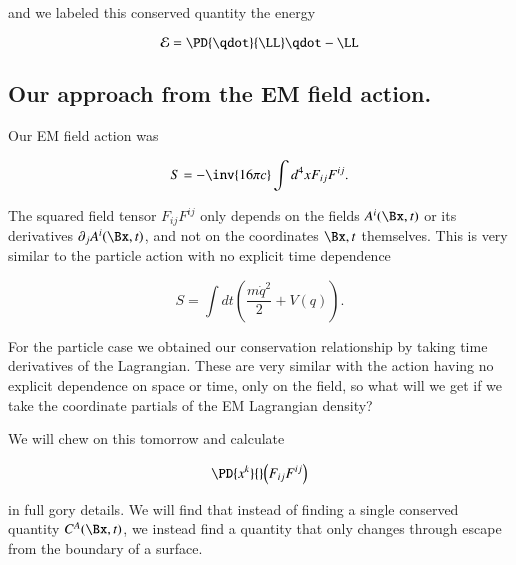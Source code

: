 and we labeled this conserved quantity the energy

\begin{equation}\label{eqn:relativisticElectrodynamicsL21:420}
\mathcal{E} = \PD{\qdot}{\LL} \qdot -\LL 
\end{equation}

\subsection{Our approach from the EM field action.}

Our EM field action was

\begin{equation}\label{eqn:relativisticElectrodynamicsL21:500}
S = -\inv{16 \pi c} \int d^4 x F_{i j} F^{i j}.
\end{equation}

The squared field tensor $F_{i j} F^{i j}$ only depends on the fields $A^i(\Bx, t)$ or its derivatives $\partial_j A^i(\Bx, t)$, and not on the coordinates $\Bx, t$ themselves.  This is very similar to the particle action with no explicit time dependence

\begin{equation}\label{eqn:relativisticElectrodynamicsL21:520}
S = \int dt \left( \frac{m \dot{q}^2}{2} + V(q) \right).
\end{equation}

For the particle case we obtained our conservation relationship by taking time derivatives of the Lagrangian.  These are very similar with the action having no explicit dependence on space or time, only on the field, so what will we get if we take the coordinate partials of the EM Lagrangian density?

We will chew on this tomorrow and calculate 

\begin{equation}\label{eqn:relativisticElectrodynamicsL21:540}
\PD{x^k}{} \Bigl( F_{i j} F^{i j} \Bigr)
\end{equation}

in full gory details.  We will find that instead of finding a single conserved quantity $C^A(\Bx, t)$, we instead find a quantity that only changes through escape from the boundary of a surface.

\EndArticle
